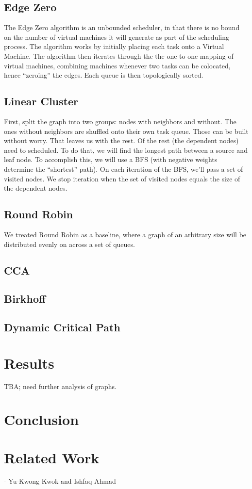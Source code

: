 \documentclass[11pt, oneside]{article}   	%
\begin{document}
\subsection{Edge Zero}

The Edge Zero algorithm is an unbounded scheduler, in that there is no bound on the number of virtual machines it will generate as part of the scheduling process. The algorithm works by initially placing each task onto a Virtual Machine. The algorithm then iterates through the the one-to-one mapping of virtual machines, combining machines whenever two tasks can be colocated, hence ``zeroing'' the edges. Each queue is then topologically sorted.

\subsection{Linear Cluster}
First, split the graph into two groups: nodes with neighbors and without. The ones without neighbors are shuffled onto their own task queue. Those can be built without worry. That leaves us with the rest. Of the rest (the dependent nodes) need to scheduled. To do that, we will find the longest path between a source and leaf node. To accomplish this, we will use a BFS (with negative weights determine the ``shortest'' path). On each iteration of the BFS, we'll pass a set of visited nodes. We stop iteration when the set of visited nodes equals the size of the dependent nodes.

\subsection{Round Robin}
We treated Round Robin as a baseline, where a graph of an arbitrary size will be distributed evenly on across a set of queues.

\subsection{CCA}
\subsection{Birkhoff}
\subsection{Dynamic Critical Path}

\section{Results}

TBA; need further analysis of graphs.

\section{Conclusion}

\section{Related Work}

- Yu-Kwong Kwok and Ishfaq Ahmad
\end{document}
